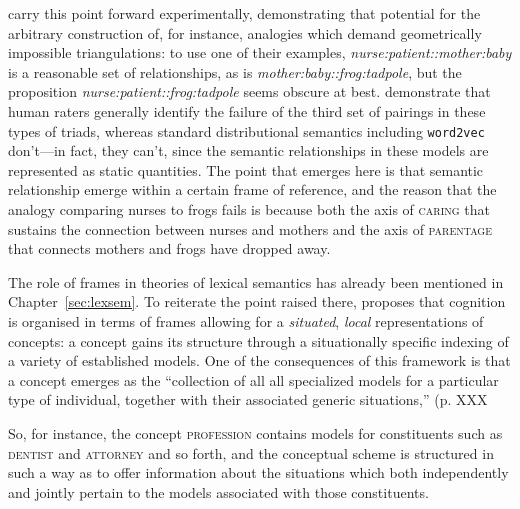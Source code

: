 \cite{ChenEA2017} carry this point forward experimentally, demonstrating that potential for the arbitrary construction of, for instance, analogies which demand geometrically impossible triangulations: to use one of their examples, \emph{nurse:patient::mother:baby} is a reasonable set of relationships, as is \emph{mother:baby::frog:tadpole}, but the proposition \emph{nurse:patient::frog:tadpole} seems obscure at best.  \citeauthor{ChenEA2017} demonstrate that human raters generally identify the failure of the third set of pairings in these types of triads, whereas standard distributional semantics including \texttt{word2vec} don't---in fact, they can't, since the semantic relationships in these models are represented as static quantities.  The point that emerges here is that semantic relationship emerge within a certain frame of reference, and the reason that the analogy comparing nurses to frogs fails is because both the axis of \textsc{caring} that sustains the connection between nurses and mothers and the axis of \textsc{parentage} that connects mothers and frogs have dropped away.

The role of frames in theories of lexical semantics has already been mentioned in Chapter~\ref{sec:lexsem}.  To reiterate the point raised there, \cite{BarsalouEA1993} proposes that cognition is organised in terms of frames allowing for a \emph{situated}, \emph{local} representations of concepts: a concept gains its structure through a situationally specific indexing of a variety of established models.  One of the consequences of this framework is that a concept emerges as the ``collection of all all specialized models for a particular type of individual, together with their associated generic situations,'' (p. XXX

So, for instance, the concept \textsc{profession} contains models for constituents such as \textsc{dentist} and \textsc{attorney} and so forth, and the conceptual scheme is structured in such a way as to offer information about the situations which both independently and jointly pertain to the models associated with those constituents.

